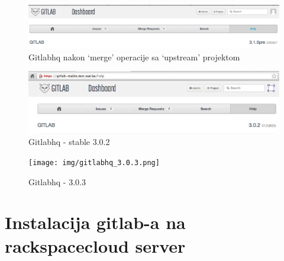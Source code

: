 \documentclass[times, utf8, seminar]{fit}
\begin{document}
\begin{figure}[H]
\centering
\includegraphics[width=15cm]{img/gitlab_hernad_310_after_merge.png}
\caption{Gitlabhq nakon `merge' operacije sa `upstream' projektom}
\end{figure}

\begin{figure}[H]
\centering
\includegraphics[width=15cm]{img/gitlab_stable_3.0.2.png}
\caption{Gitlabhq - stable 3.0.2}
\end{figure}


\begin{figure}[H]
\centering
\texttt{[image: img/gitlabhq\_3.0.3.png]}
\caption{Gitlabhq - 3.0.3}
\end{figure}


\chapter{Instalacija gitlab-a na rackspacecloud server}
\end{document}
